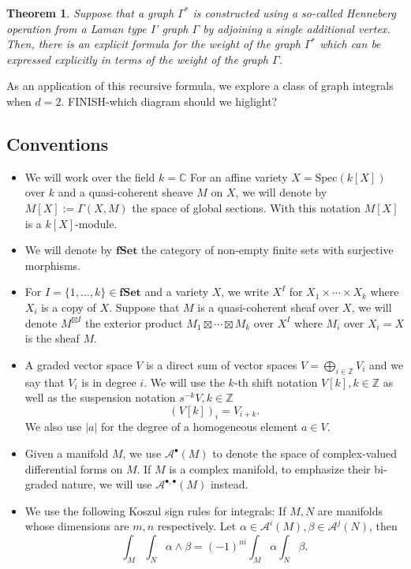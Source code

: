 \documentclass[11pt]{amsart}
\newtheorem*{thm*}{Theorem}
\theoremstyle{definition}
\theoremstyle{remark}
\numberwithin{equation}{section}
\newcommand{\CC}{\mathbb{C}}
\newcommand{\bu}{\bullet}
\begin{document}
\begin{thm*}
  Suppose that a graph $\Gamma^*$ is constructed using a so-called Henneberg operation from a Laman type I' graph
  $\Gamma$ by adjoining a single additional vertex.
  Then, there is an explicit formula for the weight of the graph $\Gamma^*$ which can be expressed \textit{explicitly}
  in terms of the weight of the graph $\Gamma$.
\end{thm*}

As an application of this recursive formula, we explore a class of graph integrals when $d=2$.
FINISH-which diagram should we higlight?


\subsection*{Conventions}

\begin{itemize}

  \item We will work over the field $k = \CC$ %
        For an affine variety $X=\mathrm{Spec}(k[X])$ over $k$ and a quasi-coherent sheave $M$ on $X$, we will denote by $M[X]:=\Gamma(X,M)$ the space of global sections. With this notation $M[X]$ is a $k[X]$-module.
\item We will denote by $\mathbf{fSet}$ the category of non-empty finite sets with surjective morphisms. 
\item For ${I}=\{1,\dots,k\}\in {\mathbf{fSet}}$ and a variety $X$, we write $X^{{I}}$ for $X_1\times \cdots \times X_k$ where $X_i$ is a copy of $X$. Suppose that $M$ is a quasi-coherent sheaf over $X$, we will denote $M^{\boxtimes{I}}$ the exterior product $M_1\boxtimes \cdots \boxtimes M_k$ over $X^{{I}}$ where $M_i$ over $X_i=X$ is the sheaf $M$.
  \item A graded vector space $V$ is a direct sum of vector spaces $V=\mathop{\bigoplus}\limits_{i\in\mathbb{Z}}V_i$ and we say that $V_{i}$ is in degree $i$.
        We will use the $k$-th shift notation $V[k],k\in \mathbb{Z}$ as well as the suspension notation $s^{-k}V,k\in\mathbb{Z}$
$$
(V[k])_i=V_{i+k}.$$
We also use $|a|$ for the degree of a homogeneous element $a\in V.$
\item Given a manifold $M$, we use $\mathcal{A}^{\bu}(M)$ to denote the space
        of complex-valued differential forms on $M$.
        If $M$ is a
    complex manifold, to emphasize their bi-graded nature, we will use
    $\mathcal{A}^{\bu,\bu} (M)$ instead.
\item We use the following Koszul sign rules for integrals: If $M, N$ are manifolds whose dimensions are $m, n$ respectively. Let $\alpha \in \mathcal{A}^{i}(M),     \beta \in \mathcal{A}^{j}(N)$, then 
$$
\int_M \int_N \alpha \wedge\beta = (- 1)^{n i} \int_M \alpha \int_N \beta . 
$$
\end{itemize}
\end{document}
